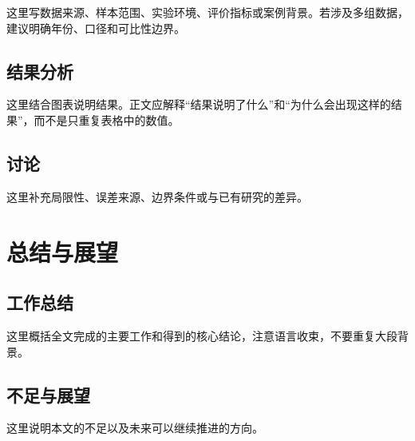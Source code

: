 这里写数据来源、样本范围、实验环境、评价指标或案例背景。若涉及多组数据，建议明确年份、口径和可比性边界。

\section{结果分析}

这里结合图表说明结果。正文应解释“结果说明了什么”和“为什么会出现这样的结果”，而不是只重复表格中的数值。

\section{讨论}

这里补充局限性、误差来源、边界条件或与已有研究的差异。

\chapter{总结与展望}

\section{工作总结}

这里概括全文完成的主要工作和得到的核心结论，注意语言收束，不要重复大段背景。

\section{不足与展望}

这里说明本文的不足以及未来可以继续推进的方向。
